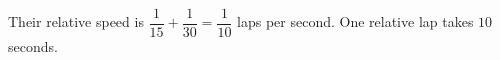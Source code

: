 Their relative speed is $\dfrac{1}{15}+\dfrac{1}{30}=\dfrac{1}{10}$ laps per second. One relative lap takes $\boxed{10}$ seconds.
